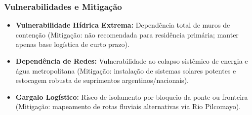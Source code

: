 \subsubsection{Vulnerabilidades e
Mitigação}

\begin{itemize}
\tightlist
\item
  \textbf{Vulnerabilidade Hídrica Extrema:} Dependência total de muros
  de contenção (Mitigação: não recomendada para residência primária;
  manter apenas base logística de curto prazo).
\item
  \textbf{Dependência de Redes:} Vulnerabilidade ao colapso sistêmico de
  energia e água metropolitana (Mitigação: instalação de sistemas
  solares potentes e estocagem robusta de suprimentos
  argentinos/\allowbreak nacionais).
\item
  \textbf{Gargalo Logístico:} Risco de isolamento por bloqueio da ponte
  ou fronteira (Mitigação: mapeamento de rotas fluviais alternativas via
  Rio Pilcomayo).
\end{itemize}

